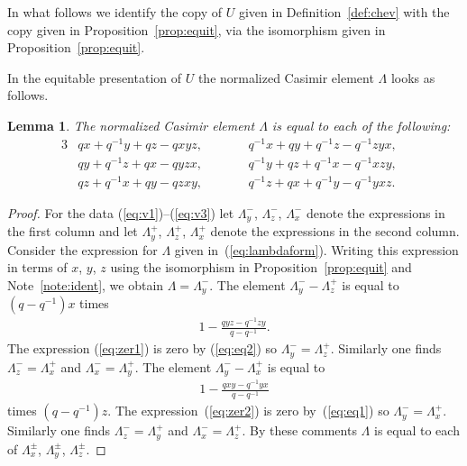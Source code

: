 \documentclass[11pt]{article}
\numberwithin{equation}{section}
\newtheorem{Lemma}[Theorem]{Lemma}
\begin{document}
\begin{Note}
\label{note:ident}
In what follows we identify the copy of
$U$ given in
Def\/inition~\ref{def:chev}
with
the copy given in
Proposition~\ref{prop:equit},
via the isomorphism given in
Proposition~\ref{prop:equit}.
\end{Note}


In the equitable presentation
of $U$
the normalized Casimir element $\Lambda$ looks as follows.

\begin{Lemma}
\label{lem:sixforms}
The normalized Casimir element $\Lambda$ is equal to each of
the following:
\begin{alignat}{3}
& qx+q^{-1}y+qz-qxyz,
\qquad &&
q^{-1}x+qy+q^{-1}z-q^{-1}zyx, &
\label{eq:v1}
\\
& qy+q^{-1}z+qx-qyzx,
\qquad &&
q^{-1}y+qz+q^{-1}x-q^{-1}xzy,&
\label{eq:v2}
\\
& qz+q^{-1}x+qy-qzxy,
\qquad &&
q^{-1}z+qx+q^{-1}y-q^{-1}yxz.&
\label{eq:v3}
\end{alignat}
\end{Lemma}

\begin{proof}
For the data
(\ref{eq:v1})--(\ref{eq:v3})
let
$\Lambda^-_y$, $\Lambda^-_z$, $\Lambda^-_x$
denote the
expressions in the f\/irst column
and let
$\Lambda^+_y$, $\Lambda^+_z$, $\Lambda^+_x$ denote
the
expressions in the second column.
Consider the expression for
$\Lambda$ given in~(\ref{eq:lambdaform}).
Writing this expression in terms of $x$, $y$, $z$ using
the isomorphism in
Proposition~\ref{prop:equit} and Note~\ref{note:ident},
we obtain
$\Lambda=\Lambda^-_y$.
The element $\Lambda^-_y-\Lambda^+_z$ is equal to
$(q-q^{-1})x$ times
\begin{gather}
1 - \frac{qyz-q^{-1}zy}{q-q^{-1}}.
\label{eq:zer1}
\end{gather}
The expression
(\ref{eq:zer1}) is zero by
(\ref{eq:eq2}) so
$\Lambda^-_y=\Lambda^+_z$.
Similarly one f\/inds
$\Lambda^-_z=\Lambda^+_x$ and
$\Lambda^-_x=\Lambda^+_y$.
The element $\Lambda^-_y-\Lambda^+_x$ is equal to
\begin{gather}
1 - \frac{qxy-q^{-1}yx}{q-q^{-1}}
\label{eq:zer2}
\end{gather}
times
$(q-q^{-1})z$.
The expression~(\ref{eq:zer2}) is zero by~(\ref{eq:eq1}) so
$\Lambda^-_y=\Lambda^+_x$.
Similarly one f\/inds
$\Lambda^-_z=\Lambda^+_y$ and
$\Lambda^-_x=\Lambda^+_z$.
By these comments $\Lambda$ is equal to each of
$\Lambda^{\pm }_x$, $\Lambda^{\pm }_y$, $\Lambda^{\pm }_z$.
\end{proof}
\end{document}

